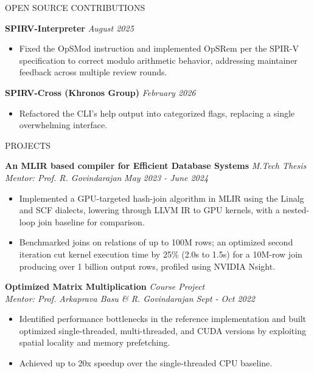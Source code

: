 \documentclass{resume} %
\begin{document}
\begin{rSection}{OPEN SOURCE CONTRIBUTIONS}

\textbf{SPIRV-Interpreter} \hfill{\emph{August 2025} \href{https://github.com/mmoult/SPIRV-Interpreter/pull/24}{}}
\begin{itemize}[noitemsep, leftmargin=*]
    \item Fixed the OpSMod instruction and implemented OpSRem per the SPIR-V specification to correct modulo arithmetic behavior, addressing maintainer feedback across multiple review rounds.
\end{itemize}
\vspace{0.15cm}

\textbf{SPIRV-Cross (Khronos Group)} \hfill{\emph{February 2026} \href{https://github.com/KhronosGroup/SPIRV-Cross/pull/2602}{}}
\begin{itemize}[noitemsep, leftmargin=*]
    \item Refactored the CLI's help output into categorized flags, replacing a single overwhelming interface.
\end{itemize}

\end{rSection}

\begin{rSection}{PROJECTS}

\textbf{An MLIR based compiler for Efficient Database Systems} \hfill{\emph{M.Tech Thesis} \href{https://github.com/deveshv-99/mlir-HashJoin}{}}
\\ \emph{Mentor: Prof. R. Govindarajan} \hfill{\emph{May 2023 - June 2024}}
\begin{itemize}[noitemsep, leftmargin=*]
    \item Implemented a GPU-targeted hash-join algorithm in MLIR using the Linalg and SCF dialects, lowering through LLVM IR to GPU kernels, with a nested-loop join baseline for comparison.
    \item Benchmarked joins on relations of up to 100M rows; an optimized second iteration cut kernel execution time by 25\% (2.0s to 1.5s) for a 10M-row join producing over 1 billion output rows, profiled using NVIDIA Nsight.
\end{itemize}
\vspace{0.15cm}

\textbf{Optimized Matrix Multiplication} \hfill{\emph{Course Project} \href{https://github.com/deveshv-99/Optimized-Matrix-Multiplication-}{}}
\\ \emph{Mentor: Prof. Arkaprava Basu \& R. Govindarajan} \hfill{\emph{Sept - Oct 2022}}
\begin{itemize}[noitemsep, leftmargin=*]
    \item Identified performance bottlenecks in the reference implementation and built optimized single-threaded, multi-threaded, and CUDA versions by exploiting spatial locality and memory prefetching.
    \item Achieved up to 20x speedup over the single-threaded CPU baseline.
\end{itemize}

\end{rSection}
\end{document}
